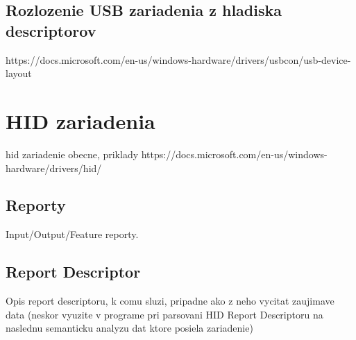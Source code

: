 \subsection{Rozlozenie USB zariadenia z hladiska descriptorov}
https://docs.microsoft.com/en-us/windows-hardware/drivers/usbcon/usb-device-layout
\section{HID zariadenia}
hid zariadenie obecne, priklady
https://docs.microsoft.com/en-us/windows-hardware/drivers/hid/
\subsection{Reporty}
Input/Output/Feature reporty.
\subsection{Report Descriptor}
Opis report descriptoru, k comu sluzi, pripadne ako z neho vycitat zaujimave data (neskor vyuzite v programe pri parsovani HID Report Descriptoru na naslednu semanticku analyzu dat ktore posiela zariadenie)





